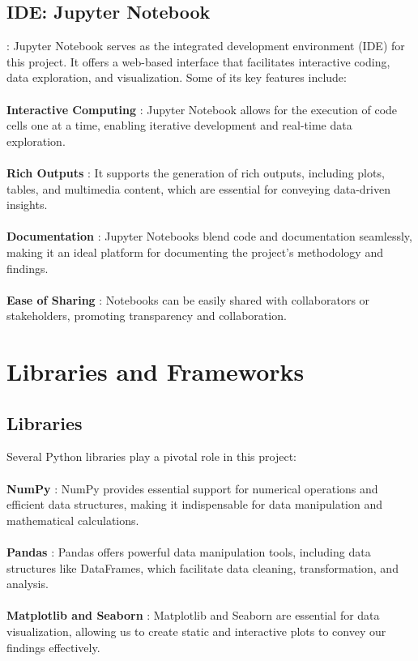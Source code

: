 \documentclass{article}
\begin{document}
\subsection{IDE: Jupyter Notebook} : Jupyter Notebook serves as the integrated development environment (IDE) for this project. It offers a web-based interface that facilitates interactive coding, data exploration, and visualization. Some of its key features include:\\ \\ \textbf{Interactive Computing} : Jupyter Notebook allows for the execution of code cells one at a time, enabling iterative development and real-time data exploration.\\ \\ \textbf{Rich Outputs} : It supports the generation of rich outputs, including plots, tables, and multimedia content, which are essential for conveying data-driven insights.\\ \\ \textbf{Documentation} : Jupyter Notebooks blend code and documentation seamlessly, making it an ideal platform for documenting the project's methodology and findings.\\ \\ \textbf{Ease of Sharing} : Notebooks can be easily shared with collaborators or stakeholders, promoting transparency and collaboration.

\section{Libraries and Frameworks}
\vspace{0.3cm}
\subsection{Libraries}
Several Python libraries play a pivotal role in this project:\\ \\ \textbf{NumPy} : NumPy provides essential support for numerical operations and efficient data structures, making it indispensable for data manipulation and mathematical calculations.\\ \\ \textbf{Pandas} : 
Pandas offers powerful data manipulation tools, including data structures like DataFrames, which facilitate data cleaning, transformation, and analysis.\\ \\ \textbf{Matplotlib and Seaborn} : Matplotlib and Seaborn are essential for data visualization, allowing us to create static and interactive plots to convey our findings effectively.
\vspace{0.3cm}
\end{document}
